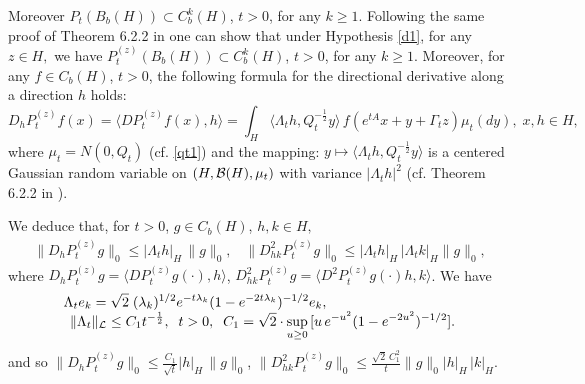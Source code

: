 \documentclass[preprint]{imsart}
\def\ds{\displaystyle}
\begin{document}
Moreover $P_t (B_b(H)) \subset C_b^{k}(H)$, $t>0$, for any $k \ge 1$. Following the same proof of Theorem 6.2.2 in \cite{DZ1} one can show that 
 under Hypothesis \ref{d1}, for any $z \in H,$ we have 
$P_t^{(z)} (B_b(H)) \subset  C_b^{k}(H)$, $t>0$, for any  $k \ge 1$.
  Moreover, for any $f \in C_b(H)$, $t>0$, the following formula for the directional derivative along a direction $h$ holds: 
\begin{equation}
\label{e3} 
D_h P_t^{(z)} f(x) = 
\langle D P_t^{(z)} f(x),h
 \rangle  = \int_H \langle
  \Lambda_t h,Q_t^{-\frac12} y\rangle \, f (e^{tA}x+y+ \Gamma_t z) \mu_t(dy),
  \; x,  h \in H,
\end{equation}
 where $\mu_t = N(0,Q_t)$ (cf. \eqref{qt1}) and the mapping: $y \mapsto \langle
  \Lambda_t h,Q_t^{-\frac12} y\rangle$ is a centered
   Gaussian random variable
 on $(H, {\cal B}(H),\mu_t)$  with variance $ |\Lambda_t h|^2$
   (cf. Theorem 6.2.2 in \cite{DZ1}). 
   
   We deduce that,  for $t >0$, $g   \in C_b(H)$, $h,k \in H,$
   \begin{equation}\label{wdc}
 \begin{array}{l}
 \| D_h P_t^{(z)} g\|_0 \le |\Lambda_t  h|_H \,  \| g\|_0, \;\;\; 
 \| D^2_{hk} P_t^{(z)} g\|_0 \le 
  |  \Lambda_t h|_H \, |\Lambda_t k|_H \| g\|_0, 
\end{array} 
 \end{equation}
where $D_h P_t^{(z)} g= \langle D P_t^{(z)} g(\cdot),h \rangle $, $D^2_{hk} P_t^{(z)} g
 =  \langle D^2 P_t^{(z)} g(\cdot)h,k \rangle $.   
   We have 
 \begin{equation} \label{e5}  
 \begin{array}{l}
 \ds   \Lambda_t e_k =\sqrt
2\;(\lambda_k)^{1/2}e^{-t\lambda_k}(1-e^{-2t\lambda_k})^{-1/2} e_k,
\\  \ds   
\;\,  \| \Lambda_t \|_{\cal L}\le C_1
t^{-\frac{1}{2}}, \;\; t>0, \; \; C_1 = \sqrt
2 \cdot \sup_{u \ge 0} { [u \, e^{-u^2}}{(1- e^{-2u^2})^{-1/2}}].
\end{array}
\end{equation}    
and so    $ \| D_h P_t^{(z)} g\|_0 \le \frac{C_1}{\sqrt{t}}|h|_H \,  \| g\|_0$, 
$ \| D^2_{hk} P_t^{(z)} g\|_0 \le \frac{\sqrt{2}\, C_1^2}{{t}} \| g\|_0 |h|_H \, |k|_H$. 
 
\end{document}

